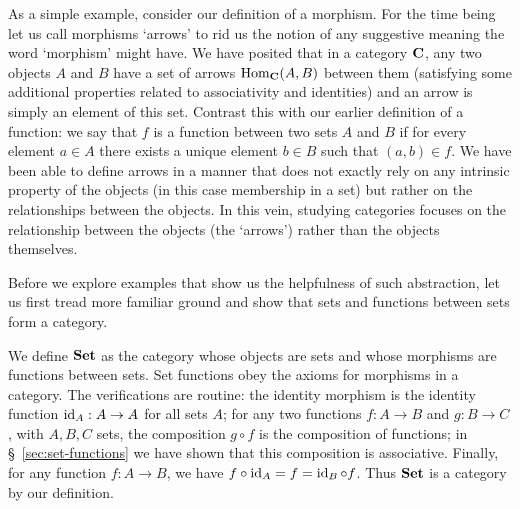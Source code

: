As a simple example, consider our definition of a morphism. For the time being
let us call morphisms `arrows' to rid us the notion of any suggestive meaning
the word `morphism' might have. We have posited that in a category \(\mathbf{C}\),
any two objects \(A\) and \(B\) have a set of arrows \(\operatorname{Hom}_{\mathbf{C}}(A, B)\)
between them (satisfying some additional properties related to associativity and
identities) and an arrow is simply an element of this set. Contrast this with
our earlier definition of a function: we say that \(f\) is a function between
two sets \(A\) and \(B\) if for every element \(a \in A\) there exists a unique
element \(b \in B\) such that \((a, b) \in f\). We have been able to define
arrows in a manner that does not exactly rely on any intrinsic property of the
objects (in this case membership in a set) but rather on the relationships
between the objects. In this vein, studying categories focuses on the
relationship between the objects (the `arrows') rather than the objects
themselves.

Before we explore examples that show us the helpfulness of such abstraction, let
us first tread more familiar ground and show that sets and functions between
sets form a category.

\begin{example}
    We define \(\mathbf{Set}\) as the category whose objects are sets and whose
    morphisms are functions between sets. Set functions obey the axioms for
    morphisms in a category. The verifications are routine: the identity
    morphism is the identity function \(\operatorname{id}_A : A \to A\) for all sets \(A\);
    for any two functions \(f: A \to B\) and \(g: B \to C\), with \(A, B, C\)
    sets, the composition \(g \circ f\) is the composition of functions; in
    \S~\ref{sec:set-functions} we have shown that this composition is
    associative. Finally, for any function \(f: A \to B\), we have \(f \circ
    \operatorname{id}_A = f = \operatorname{id}_B \circ f\). Thus \(\mathbf{Set}\) is a category by our definition.
\end{example}

